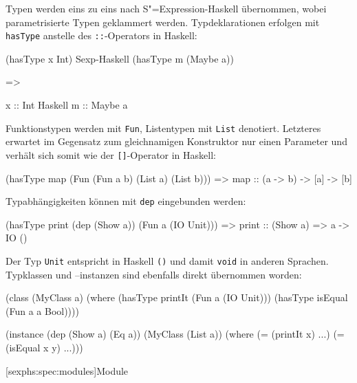 \documentclass[11pt, a4paper, bibgerm]{scrbook}
\newenvironment{DIFnomarkup}{}{}
\newcommand\icode[1]{\lstinline?#1?}
\newcommand\lsubsection{}
\newcommand{\sexp}{S"=Expression}
\begin{document}
Typen werden eins zu eins nach \sexp{}-Haskell übernommen, wobei
parametrisierte Typen geklammert werden. Typdeklarationen erfolgen
mit \icode{hasType} anstelle des \icode{::}-Operators in Haskell:
\begin{DIFnomarkup}\begin{code}
(hasType x Int)
                                      Sexp-Haskell
(hasType m (Maybe a))

=>

x :: Int
                                      Haskell
m :: Maybe a
\end{code}\end{DIFnomarkup}
Funktionstypen werden mit \icode{Fun}, Listentypen mit \icode{List}
denotiert. Letzteres erwartet im Gegensatz zum gleichnamigen
Konstruktor nur einen Parameter und verhält sich somit wie der
\icode{[]}-Operator in Haskell:
\begin{DIFnomarkup}\begin{code}
(hasType map (Fun (Fun a b) (List a) (List b)))
=>
map :: (a -> b) -> [a] -> [b]                  
\end{code}\end{DIFnomarkup}
Typabhängigkeiten können mit \icode{dep} eingebunden werden:
\begin{DIFnomarkup}\begin{code}
(hasType print (dep (Show a)) (Fun a (IO Unit)))
=>
print :: (Show a) => a -> IO ()
\end{code}\end{DIFnomarkup}
Der Typ \icode{Unit} entspricht in Haskell \icode{()} und damit \icode{void}
in anderen Sprachen. Typklassen und --instanzen sind ebenfalls direkt
übernommen worden:
\begin{DIFnomarkup}\begin{code}
(class 
  (MyClass a)
  (where
    (hasType printIt (Fun a (IO Unit)))
    (hasType isEqual (Fun a a Bool))))

(instance (dep (Show a) (Eq a))
  (MyClass (List a))
  (where
    (= (printIt x)   ...)
    (= (isEqual x y) ...)))
\end{code}\end{DIFnomarkup}

\lsubsection[sexphs:spec:modules]{Module}
\end{document}
